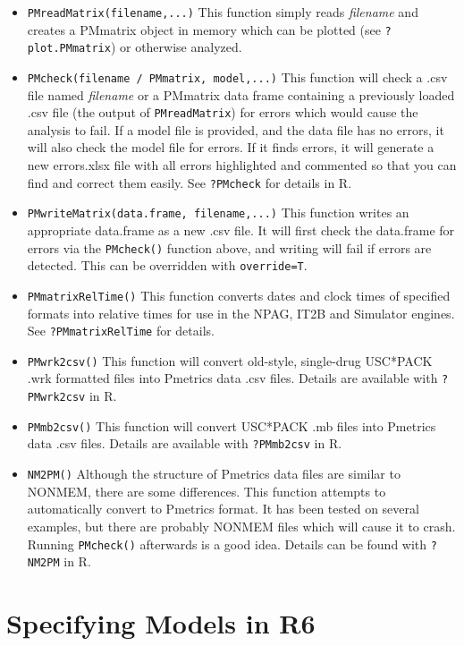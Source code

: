 \documentclass[
]{book}
\begin{document}
\begin{itemize}
\item
  \texttt{PMreadMatrix(filename,...)} This function simply reads \emph{filename} and
  creates a PMmatrix object in memory which can be plotted (see
  \texttt{?plot.PMmatrix}) or otherwise analyzed.
\item
  \texttt{PMcheck(filename\ /\ PMmatrix,\ model,...)} This function will check a .csv
  file named \emph{filename} or a PMmatrix data frame containing a previously
  loaded .csv file (the output of \texttt{PMreadMatrix}) for errors which would
  cause the analysis to fail. If a model file is provided, and the data
  file has no errors, it will also check the model file for errors. If it
  finds errors, it will generate a new errors.xlsx file with all errors
  highlighted and commented so that you can find and correct them easily.
  See \texttt{?PMcheck} for details in R.
\item
  \texttt{PMwriteMatrix(data.frame,\ filename,...)} This function writes an
  appropriate data.frame as a new .csv file. It will first check the
  data.frame for errors via the \texttt{PMcheck()} function above, and writing will
  fail if errors are detected. This can be overridden with \texttt{override=T}.
\item
  \texttt{PMmatrixRelTime()} This function converts dates and clock times of
  specified formats into relative times for use in the NPAG, IT2B and
  Simulator engines. See \texttt{?PMmatrixRelTime} for details.
\item
  \texttt{PMwrk2csv()} This function will convert old-style, single-drug USC*PACK
  .wrk formatted files into Pmetrics data .csv files. Details are
  available with \texttt{?PMwrk2csv} in R.
\item
  \texttt{PMmb2csv()} This function will convert USC*PACK .mb files into Pmetrics
  data .csv files. Details are available with \texttt{?PMmb2csv} in R.
\item
  \texttt{NM2PM()} Although the structure of Pmetrics data files are similar to
  NONMEM, there are some differences. This function attempts to
  automatically convert to Pmetrics format. It has been tested on several
  examples, but there are probably NONMEM files which will cause it to
  crash. Running \texttt{PMcheck()} afterwards is a good idea. Details can be found
  with \texttt{?NM2PM} in R.
\end{itemize}

\hypertarget{specifying-models-in-r6}{%
\section{Specifying Models in R6}\label{specifying-models-in-r6}}
\end{document}
